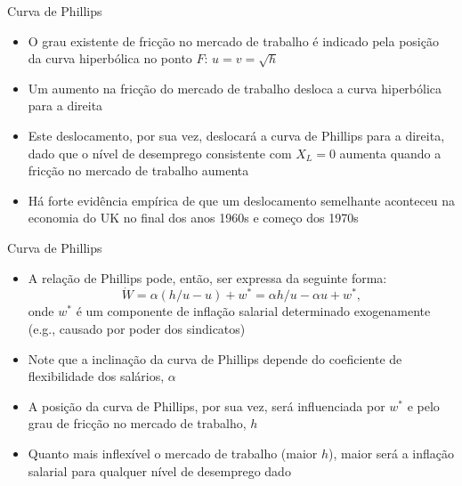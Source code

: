 \documentclass[10pt]{beamer}
\begin{document}
\begin{frame}{Curva de Phillips}
    \begin{itemize}
        \item O grau existente de fricção no mercado de trabalho é indicado pela posição da curva hiperbólica no ponto $F$: $u = v = \sqrt{h}$
        \bigskip
        \item Um aumento na fricção do mercado de trabalho desloca a curva hiperbólica para a direita
        \bigskip
        \item Este deslocamento, por sua vez, deslocará a curva de Phillips para a direita, dado que o nível de desemprego consistente com $X_L = 0$ aumenta quando a fricção no mercado de trabalho aumenta
        \bigskip
        \item Há forte evidência empírica de que um deslocamento semelhante aconteceu na economia do UK no final dos anos 1960s e começo dos 1970s
    \end{itemize}
\end{frame}

\begin{frame}{Curva de Phillips}
    \begin{itemize}
        \item A relação de Phillips pode, então, ser expressa da seguinte forma:
        \begin{equation}
            \dot{W} = \alpha(h/u - u) + w^* = \alpha h/u - \alpha u + w^*,
            \label{eq9}
        \end{equation}
        onde $w^*$ é um componente de inflação salarial determinado exogenamente (e.g., causado por poder dos sindicatos)
        \bigskip
        \item Note que a inclinação da curva de Phillips depende do coeficiente de flexibilidade dos salários, $\alpha$
        \bigskip
        \item A posição da curva de Phillips, por sua vez, será influenciada por $w^*$ e pelo grau de fricção no mercado de trabalho, $h$
        \bigskip
        \item Quanto mais inflexível o mercado de trabalho (maior $h$), maior será a inflação salarial para qualquer nível de desemprego dado
    \end{itemize}
\end{frame}
\end{document}

